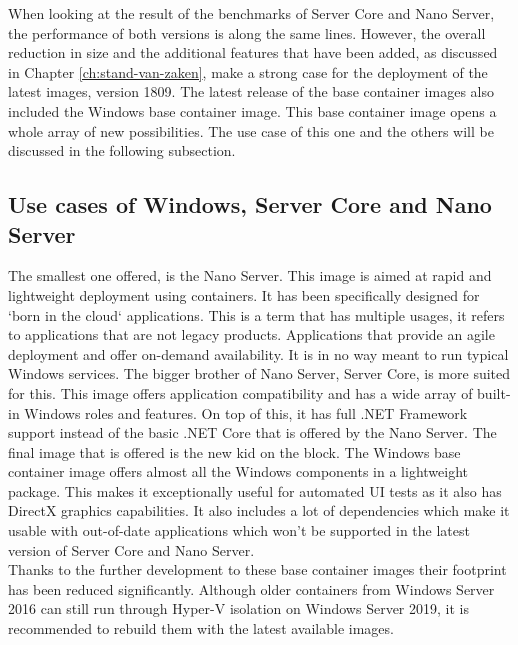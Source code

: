  When looking at the result of the benchmarks of Server Core and Nano Server, the performance of both versions is along the same lines. 
 However, the overall reduction in size and the additional features that have been added, as discussed in Chapter \ref{ch:stand-van-zaken}, make a strong case for the deployment of the latest images, version 1809. 
 The latest release of the base container images also included the Windows base container image. 
 This base container image opens a whole array of new possibilities. 
 The use case of this one and the others will be discussed in the following subsection.

\subsection{Use cases of Windows, Server Core and Nano Server}
The smallest one offered, is the Nano Server. 
This image is aimed at rapid and lightweight deployment using containers. 
It has been specifically designed for `born in the cloud` applications. 
This is a term that has multiple usages, it refers to applications that are not legacy products. 
Applications that provide an agile deployment and offer on-demand availability. 
It is in no way meant to run typical Windows services. 
The bigger brother of Nano Server, Server Core, is more suited for this. 
This image offers application compatibility and has a wide array of built-in Windows roles and features. 
On top of this, it has full .NET Framework support instead of the basic .NET Core that is offered by the Nano Server. 
The final image that is offered is the new kid on the block. 
The Windows base container image offers almost all the Windows components in a lightweight package. 
This makes it exceptionally useful for automated UI tests as it also has DirectX graphics capabilities. 
It also includes a lot of dependencies which make it usable with out-of-date applications which won't be supported in the latest version of Server Core and Nano Server. 
\\
Thanks to the further development to these base container images their footprint has been reduced significantly. 
Although older containers from Windows Server 2016 can still run through Hyper-V isolation on Windows Server 2019, it is recommended to rebuild them with the latest available images.





